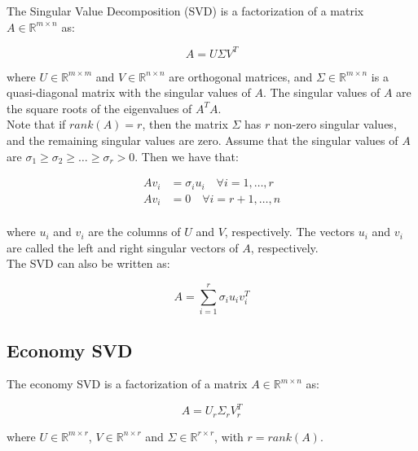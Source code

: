 The Singular Value Decomposition (SVD) is a factorization of a matrix $A \in \mathbb{R}^{m \times n}$ as:

\begin{equation}
    A = U \Sigma V^T
\end{equation}

where $U \in \mathbb{R}^{m \times m}$ and $V \in \mathbb{R}^{n \times n}$ are orthogonal matrices, and $\Sigma \in \mathbb{R}^{m \times n}$
is a quasi-diagonal matrix with the singular values of $A$. The singular values of $A$ are the square roots of the eigenvalues of $A^T A$.\\

Note that if $rank(A) = r$, then the matrix $\Sigma$ has $r$ non-zero singular values, and the remaining singular values are zero. Assume that
the singular values of $A$ are $\sigma_1 \geq \sigma_2 \geq \ldots \geq \sigma_r > 0$. Then we have that:

\begin{equation}
    \begin{aligned}
        A v_i &= \sigma_i u_i \quad \forall i = 1, \ldots, r \\
        A v_i &= 0 \quad \forall i = r+1, \ldots, n \\
    \end{aligned}
\end{equation}

where $u_i$ and $v_i$ are the columns of $U$ and $V$, respectively. The vectors $u_i$ and $v_i$ are called the left and right singular vectors
of $A$, respectively.\\

The SVD can also be written as:

\begin{equation}
    A = \sum_{i=1}^{r} \sigma_i u_i v_i^T
\end{equation}

\subsection{Economy SVD}

The economy SVD is a factorization of a matrix $A \in \mathbb{R}^{m \times n}$ as:

\begin{equation}
    A = U_r \Sigma_r V_r^T
\end{equation}

where $U \in \mathbb{R}^{m \times r}$, $V \in \mathbb{R}^{n \times r}$ and $\Sigma \in \mathbb{R}^{r \times r}$, with $r = rank(A)$.\\

